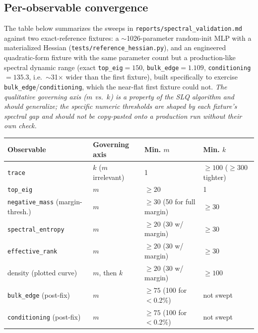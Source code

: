 \documentclass[11pt]{article}
\newcommand{\code}[1]{\texttt{#1}}
\begin{document}
\subsection{Per-observable convergence}

The table below summarizes the sweeps in \code{reports/spectral_validation.md}
against two exact-reference fixtures: a $\sim$1026-parameter random-init
MLP with a materialized Hessian (\code{tests/reference_hessian.py}), and an
engineered quadratic-form fixture with the same parameter count but a
production-like spectral dynamic range (exact \code{top_eig}\(=150\),
\code{bulk_edge}\(=1.109\), \code{conditioning}\(=135.3\), i.e.\ \(\sim\)31\(\times\)
wider than the first fixture), built specifically to exercise
\code{bulk_edge}/\code{conditioning}, which the near-flat first fixture
could not. \emph{The qualitative governing axis (\(m\) vs.\ \(k\)) is a
property of the SLQ algorithm and should generalize; the specific numeric
thresholds are shaped by each fixture's spectral gap and should not be
copy-pasted onto a production run without their own check.}

\begin{center}
\begin{tabular}{@{}l l l l@{}}
\toprule
Observable & Governing axis & Min. \(m\) & Min. \(k\) \\
\midrule
\code{trace} & \(k\) (\(m\) irrelevant) & 1 & \(\ge100\) (\(\ge300\) tighter) \\
\code{top_eig} & \(m\) & \(\ge20\) & 1 \\
\code{negative_mass} (margin-thresh.) & \(m\) & \(\ge30\) (50 for full margin) & \(\ge30\) \\
\code{spectral_entropy} & \(m\) & \(\ge20\) (30 w/ margin) & \(\ge30\) \\
\code{effective_rank} & \(m\) & \(\ge20\) (30 w/ margin) & \(\ge30\) \\
density (plotted curve) & \(m\), then \(k\) & \(\ge20\) (30 w/ margin) & \(\ge100\) \\
\code{bulk_edge} (post-fix) & \(m\) & \(\ge75\) (100 for \(<\)0.2\%) & not swept \\
\code{conditioning} (post-fix) & \(m\) & \(\ge75\) (100 for \(<\)0.2\%) & not swept \\
\bottomrule
\end{tabular}
\end{center}
\end{document}
